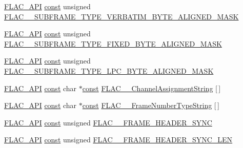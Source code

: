 \begin{DoxyCompactItemize}
\item 
\hyperlink{group__flac__export_ga56ca07df8a23310707732b1c0007d6f5}{F\+L\+A\+C\+\_\+\+A\+PI} \hyperlink{getopt1_8c_a2c212835823e3c54a8ab6d95c652660e}{const} unsigned \hyperlink{group__flac__format_ga5855173f9bc3584b545b04cf6ba8f8f8}{F\+L\+A\+C\+\_\+\+\_\+\+S\+U\+B\+F\+R\+A\+M\+E\+\_\+\+T\+Y\+P\+E\+\_\+\+V\+E\+R\+B\+A\+T\+I\+M\+\_\+\+B\+Y\+T\+E\+\_\+\+A\+L\+I\+G\+N\+E\+D\+\_\+\+M\+A\+SK}
\item 
\hyperlink{group__flac__export_ga56ca07df8a23310707732b1c0007d6f5}{F\+L\+A\+C\+\_\+\+A\+PI} \hyperlink{getopt1_8c_a2c212835823e3c54a8ab6d95c652660e}{const} unsigned \hyperlink{group__flac__format_gaf4ae885d07037bbcb46fb199f5f4d3a9}{F\+L\+A\+C\+\_\+\+\_\+\+S\+U\+B\+F\+R\+A\+M\+E\+\_\+\+T\+Y\+P\+E\+\_\+\+F\+I\+X\+E\+D\+\_\+\+B\+Y\+T\+E\+\_\+\+A\+L\+I\+G\+N\+E\+D\+\_\+\+M\+A\+SK}
\item 
\hyperlink{group__flac__export_ga56ca07df8a23310707732b1c0007d6f5}{F\+L\+A\+C\+\_\+\+A\+PI} \hyperlink{getopt1_8c_a2c212835823e3c54a8ab6d95c652660e}{const} unsigned \hyperlink{group__flac__format_gac5ee2d30e02fe8a3a2fe5417e1200434}{F\+L\+A\+C\+\_\+\+\_\+\+S\+U\+B\+F\+R\+A\+M\+E\+\_\+\+T\+Y\+P\+E\+\_\+\+L\+P\+C\+\_\+\+B\+Y\+T\+E\+\_\+\+A\+L\+I\+G\+N\+E\+D\+\_\+\+M\+A\+SK}
\item 
\hyperlink{group__flac__export_ga56ca07df8a23310707732b1c0007d6f5}{F\+L\+A\+C\+\_\+\+A\+PI} \hyperlink{getopt1_8c_a2c212835823e3c54a8ab6d95c652660e}{const} char $\ast$\hyperlink{getopt1_8c_a2c212835823e3c54a8ab6d95c652660e}{const} \hyperlink{group__flac__format_ga56e0484fe205ab9f699ba5413c8441a1}{F\+L\+A\+C\+\_\+\+\_\+\+Channel\+Assignment\+String} \mbox{[}$\,$\mbox{]}
\item 
\hyperlink{group__flac__export_ga56ca07df8a23310707732b1c0007d6f5}{F\+L\+A\+C\+\_\+\+A\+PI} \hyperlink{getopt1_8c_a2c212835823e3c54a8ab6d95c652660e}{const} char $\ast$\hyperlink{getopt1_8c_a2c212835823e3c54a8ab6d95c652660e}{const} \hyperlink{group__flac__format_ga79fbcf4b5c8dd457f83782479fe01222}{F\+L\+A\+C\+\_\+\+\_\+\+Frame\+Number\+Type\+String} \mbox{[}$\,$\mbox{]}
\item 
\hyperlink{group__flac__export_ga56ca07df8a23310707732b1c0007d6f5}{F\+L\+A\+C\+\_\+\+A\+PI} \hyperlink{getopt1_8c_a2c212835823e3c54a8ab6d95c652660e}{const} unsigned \hyperlink{group__flac__format_gaf8a0d3e8d4b884184d9c3989480748e9}{F\+L\+A\+C\+\_\+\+\_\+\+F\+R\+A\+M\+E\+\_\+\+H\+E\+A\+D\+E\+R\+\_\+\+S\+Y\+NC}
\item 
\hyperlink{group__flac__export_ga56ca07df8a23310707732b1c0007d6f5}{F\+L\+A\+C\+\_\+\+A\+PI} \hyperlink{getopt1_8c_a2c212835823e3c54a8ab6d95c652660e}{const} unsigned \hyperlink{group__flac__format_gaf8b98ef56e49b221414aadbea5baaaf0}{F\+L\+A\+C\+\_\+\+\_\+\+F\+R\+A\+M\+E\+\_\+\+H\+E\+A\+D\+E\+R\+\_\+\+S\+Y\+N\+C\+\_\+\+L\+EN}

\end{DoxyCompactItemize}
